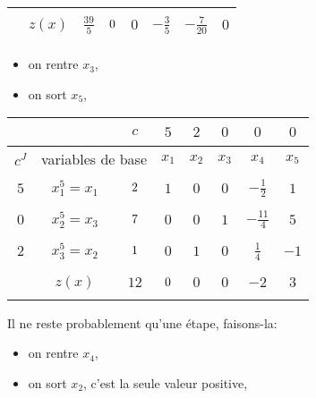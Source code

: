 \begin{td-sol}[]
\begin{enumerate}
\begin{center}
\begin{tabular}{|ccc|ccccc|}
                \hline %
                \multicolumn{1}{|c|}{} &\(z(x)\)& \multicolumn{1}{|c|}{\(\frac{39}{5}\)} &\(\vphantom{\dfrac16}0\)&\(0\)&\(-\frac{3}{5}\)&\(-\frac{7}{20}\)&\(0\)\\
                \hline %
            \end{tabular}
        \end{center}
        \begin{itemize}
            \item on rentre \(x_3\),
            \item on sort \(x_5\),
        \end{itemize}
        \becomes{}
        \begin{center}
            \begin{tabular}{|ccc|ccccc|} %
                \hline  %
                & \ &\(c\)&\(5\)&\(2\)&\(0\)&\(0\)&\(0\)\\
                \hline %
                \multicolumn{1}{|c|}{\(c^J\)}& \multicolumn{2}{c|}{variables de base}&\(x_1\)&\(x_2\)&\(x_3\)&\(x_4\)&\(x_5\)\\
                \hline %
                \multicolumn{1}{|c|}{\(5\)}& \multicolumn{1}{c|}{\(x_1^{5}=x_1\)} &\(\vphantom{\dfrac16}2\)&\(1\)&\(0\)&\(0\)&\(-\frac{1}{2}\)&\(1\)\\
                \hline %
                \multicolumn{1}{|c|}{\(0\)}& \multicolumn{1}{c|}{\(x_2^{5}=x_3\)} &\(\vphantom{\dfrac16}7\)&\(0\)&\(0\)&\(1\)&\(-\frac{11}{4}\)&\(5\)\\
                \hline %
                \multicolumn{1}{|c|}{\(2\)}& \multicolumn{1}{c|}{\(x_3^{5}=x_2\)} &\(\vphantom{\dfrac16}1\)&\(0\)&\(1\)&\(0\)&\(\frac{1}{4}\)&\(-1\)\\
                \hline %
                \multicolumn{1}{|c|}{} &\(z(x)\)& \multicolumn{1}{|c|}{\(12\)} &\(\vphantom{\dfrac16}0\)&\(0\)&\(0\)&\(-2\)&\(3\)\\
                \hline %
            \end{tabular}
        \end{center}
        Il ne reste probablement qu'une étape, faisons-la:
        \begin{itemize}
            \item on rentre \(x_4\),
            \item on sort \(x_2\), c'est la seule valeur positive,
        \end{itemize}

\end{enumerate}
\end{td-sol}
